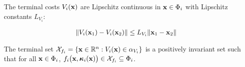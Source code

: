 \begin{gg_box}
\begin{assumption}

  The terminal costs $V_i(\bm{\mathbf{x}})$ are Lipschitz continuous in $\bm{\mathbf{x}} \in \Phi_i$
  with Lipschitz constants $L_{V_i}$:

  \begin{align}
    \| V_i(\bm{\mathbf{x}}_1) - V_i(\bm{\mathbf{x}}_2)\| \leq L_{V_i} \|\bm{\mathbf{x}}_1 - \bm{\mathbf{x}}_2 \|
  \end{align}

  \label{ass:V_i_Lipschitz}
\end{assumption}
\end{gg_box}


\begin{gg_box}
\begin{assumption}

  The terminal set $\mathcal{X}_{f_i} = \{ \bm{\mathbf{x}} \in \mathbb{R}^n : V_i(\bm{\mathbf{x}}) \in \alpha_{V_i}\}$
  is a positively invariant set such that for all
  $\bm{\mathbf{x}} \in \Phi_i$, $f_i\big(\bm{\mathbf{x}}, \bm{\mathbf{\kappa}}_i(\bm{\mathbf{x}})\big) \in \mathcal{X}_{f_i} \subseteq \Phi_i$.

  \label{ass:x_f_i}
\end{assumption}
\end{gg_box}
